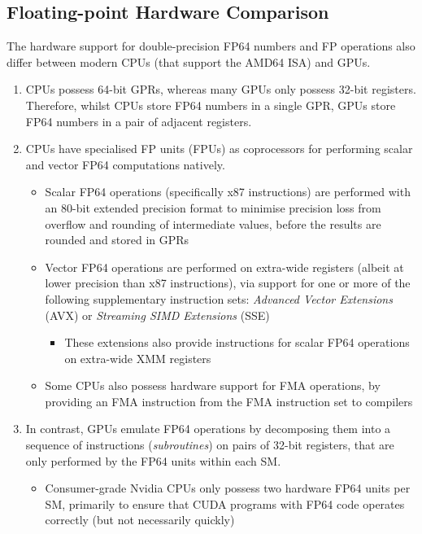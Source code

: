 \documentclass[12pt]{article}
\begin{document}
\subsection{Floating-point Hardware Comparison}
The hardware support for double-precision FP64 numbers and FP operations also differ between modern CPUs (that support the AMD64 ISA) and GPUs.
\begin{enumerate}
    \item CPUs possess 64-bit GPRs, whereas many GPUs only possess 32-bit registers. Therefore, whilst CPUs store FP64 numbers in a single GPR, GPUs store FP64 numbers in a pair of adjacent registers.
    \item CPUs have specialised FP units (FPUs) as coprocessors for performing scalar and vector FP64 computations natively.
    \begin{itemize}
        \item Scalar FP64 operations (specifically x87 instructions) are performed with an 80-bit extended precision format to minimise precision loss from overflow and rounding of intermediate values, before the results are rounded and stored in GPRs
        \item Vector FP64 operations are performed on extra-wide registers (albeit at lower precision than x87 instructions), via support for one or more of the following supplementary instruction sets: \textit{Advanced Vector Extensions} (AVX) or \textit{Streaming SIMD Extensions} (SSE)
        \begin{itemize}
            \item These extensions also provide instructions for scalar FP64 operations on extra-wide XMM registers
        \end{itemize}
        \item Some CPUs also possess hardware support for FMA operations, by providing an FMA instruction from the FMA instruction set to compilers
    \end{itemize}
    \item In contrast, GPUs emulate FP64 operations by decomposing them into a sequence of instructions (\textit{subroutines}) on pairs of 32-bit registers, that are only performed by the FP64 units within each SM.
    \begin{itemize}
        \item Consumer-grade Nvidia CPUs only possess two hardware FP64 units per SM, primarily to ensure that CUDA programs with FP64 code operates correctly (but not necessarily quickly) \cite{turingarchi}
        \begin{itemize}

\end{itemize}
\end{itemize}
\end{enumerate}
\end{document}
